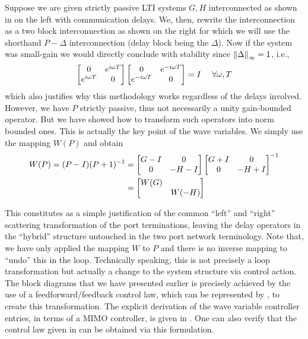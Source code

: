 Suppose we are given strictly passive LTI systems $G,H$ interconnected as shown in  on the 
left with communication delays. We, then, rewrite the interconnection as a two block interconnection as shown on 
the right for which we will use the shorthand $P-\Delta$ interconnection (delay block being the $\Delta$). Now if 
the system was small-gain we would directly conclude with stability since $\displaystyle \left\| \Delta \right\|_\infty = 1$, i.e.,
\[
\begin{bmatrix}0 &e^{i\omega T}\\e^{i\omega T}&0\end{bmatrix}\begin{bmatrix}0 &e^{-i\omega T}\\e^{-i\omega T}&0\end{bmatrix}= I \quad \ \forall\omega,T 
\]
which also justifies why this methodology works regardless of the delays involved. However, we have $P$ strictly 
passive, thus not necessarily a unity gain-bounded operator. But we have showed how to transform 
such operators into norm bounded ones. This is actually the key point of the wave variables. We simply use the mapping 
$W(P)$ and obtain 
\begin{align}
W(P) = (P-I)(P+1)^{-1} &= \begin{bmatrix}G-I & 0\\0 &-H-I\end{bmatrix}\begin{bmatrix}G+I & 0\\0 &-H+I\end{bmatrix}^{-1}\\ &= \begin{bmatrix}W(G) &\\&W(-H)\end{bmatrix}
\end{align}

This constitutes as a simple justification of the common ``left'' and ``right'' scattering transformation of the port terminations, leaving 
the delay operators in the ``hybrid'' structure untouched in the two port network terminology. Note that, we have only applied the mapping $W$ to $P$ and 
there is no inverse mapping to ``undo'' this in the loop. Technically speaking, this is not precisely a loop transformation 
but actually a change to the system structure via control action. The block diagrams that we have presented earlier is precisely 
achieved by the use of a feedforward/feedback control law, which can be represented by , to create this 
transformation. The explicit derivation of the wave variable controller entries, in terms of a MIMO controller, is given in 
\cite{christiansson2008}. One can also verify that the control law given in \cite{andersonspong} can be obtained via this formulation. 

